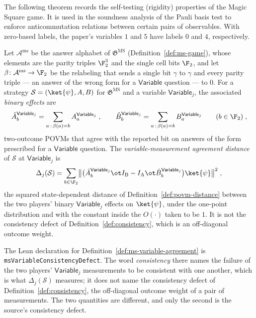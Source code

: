 The following theorem records the self-testing (rigidity) properties of the Magic Square game. It is used in the soundness analysis of the Pauli basis test to enforce anticommutation relations between certain pairs of observables.
With zero-based labels, the paper's variables $1$ and $5$ have labels $0$ and
$4$, respectively.

\begin{definition}\label{def:ms-variable-agreement}
	\leanok
	Let $\mathcal A^{\mathrm{ms}}$ be the answer alphabet of $\mathfrak{G}^{\mathrm{MS}}$ (Definition~\ref{def:ms-game}), whose elements are the parity triples $\F_2^3$ and the single cell bits $\F_2$, and let $\beta \colon \mathcal A^{\mathrm{ms}} \to \F_2$ be the relabeling that sends a single bit $\gamma$ to $\gamma$ and every parity triple --- an answer of the wrong form for a $\mathsf{Variable}$ question --- to $0$. For a strategy $\mathcal S = (\ket{\psi}, A, B)$ for $\mathfrak{G}^{\mathrm{MS}}$ and a variable $\mathsf{Variable}_j$, the associated \emph{binary effects} are
	\[
		\hat A^{\mathsf{Variable}_j}_b = \sum_{a \,:\, \beta(a) = b} A^{\mathsf{Variable}_j}_a \;, \qquad \hat B^{\mathsf{Variable}_j}_b = \sum_{a \,:\, \beta(a) = b} B^{\mathsf{Variable}_j}_a \qquad (b \in \F_2)\;,
	\]
	two-outcome POVMs that agree with the reported bit on answers of the form prescribed for a $\mathsf{Variable}$ question. The \emph{variable-measurement agreement distance} of $\mathcal S$ at $\mathsf{Variable}_j$ is
	\[
		\Delta_j(\mathcal S) = \sum_{b \in \F_2} \bigl\| \bigl( \hat A^{\mathsf{Variable}_j}_b \ot I_{\mathrm B} - I_{\mathrm A} \ot \hat B^{\mathsf{Variable}_j}_b \bigr) \ket{\psi} \bigr\|^2 \;,
	\]
	the squared state-dependent distance of Definition~\ref{def:povm-distance} between the two players' binary $\mathsf{Variable}_j$ effects on $\ket{\psi}$, under the one-point distribution and with the constant inside the $O(\cdot)$ taken to be $1$. It is not the consistency defect of Definition~\ref{def:consistency}, which is an off-diagonal outcome weight.
\end{definition}

\begin{remark}\label{rem:ms-variable-agreement-name}
	The Lean declaration for Definition~\ref{def:ms-variable-agreement} is \texttt{msVariableConsistencyDefect}. The word \emph{consistency} there names the failure of the two players' $\mathsf{Variable}_j$ measurements to be consistent with one another, which is what $\Delta_j(\mathcal S)$ measures; it does not name the consistency defect of Definition~\ref{def:consistency}, the off-diagonal outcome weight of a pair of measurements. The two quantities are different, and only the second is the source's consistency defect.
\end{remark}

